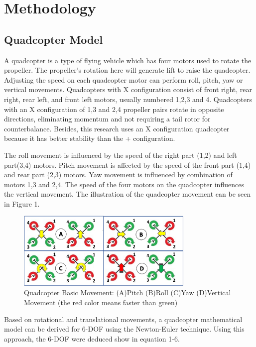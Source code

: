 \documentclass[a4paper]{jpconf}
\begin{document}
\section{Methodology}
\subsection{Quadcopter Model}
A quadcopter is a type of flying vehicle which has four motors used to rotate the propeller. The propeller's rotation here will generate lift to raise the quadcopter. Adjusting the speed on each quadcopter motor can perform roll, pitch, yaw or vertical movements. Quadcopters with X configuration consist of front right, rear right, rear left, and front left motors, usually numbered 1,2,3 and 4. Quadcopters with an X configuration of 1,3 and 2,4 propeller pairs rotate in opposite directions, eliminating momentum and not requiring a tail rotor for counterbalance. Besides, this research uses an X configuration quadcopter because it has better stability than the + configuration.

The roll movement is influenced by the speed of the right part (1,2) and left part(3,4) motors. Pitch movement is affected by the speed of the front part (1,4) and rear part (2,3) motors. Yaw movement is influenced by combination of motors 1,3 and 2,4. The speed of the four motors on the quadcopter influences the vertical movement. The illustration of the quadcopter movement can be seen in Figure 1.

\begin{figure}[h]
    \centering
    \includegraphics[width=20pc]{quadcopter-basic-movement.png}
    \caption{\label{label}Quadcopter Basic Movement: (A)Pitch (B)Roll (C)Yaw (D)Vertical Movement (the red color means faster than green)}
\end{figure}

Based on rotational and translational movements, a quadcopter mathematical model can be derived for 6-DOF using the Newton-Euler technique. Using this approach, the 6-DOF were deduced show in equation 1-6\cite{ref9}.
\end{document}

